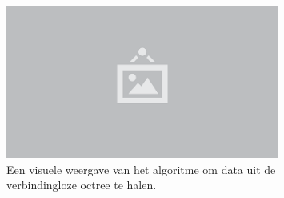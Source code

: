 \begin{figure}
  \centering
  \includegraphics[width=0.8\textwidth]{./img/raw/placeholder.png}
  \caption{Een visuele weergave van het algoritme om data uit de verbindingloze octree te halen.}
  \label{fig:hs-linkless-octree-algorithm}
\end{figure}
